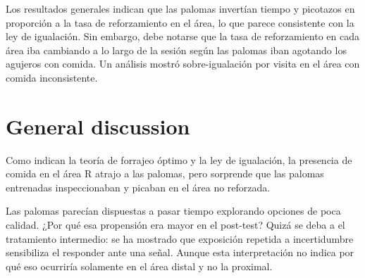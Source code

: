 \documentclass[a4paper,12pt]{article}
\begin{document}
Los resultados generales indican que las palomas invertían tiempo y picotazos en proporción a la tasa de reforzamiento en el área, lo que parece consistente con la ley de igualación. Sin embargo, debe notarse que la tasa de reforzamiento en cada área iba cambiando a lo largo de la sesión según las palomas iban agotando los agujeros con comida. Un análisis mostró sobre-igualación por visita en el área con comida inconsistente.

\section{General discussion}

Como indican la teoría de forrajeo óptimo y la ley de igualación, la presencia de comida en el área R atrajo a las palomas, pero sorprende que las palomas entrenadas inspeccionaban y picaban en el área no reforzada.

Las palomas parecían dispuestas a pasar tiempo explorando opciones de poca calidad. ¿Por qué esa propensión era mayor en el post-test? Quizá se deba a el tratamiento intermedio: se ha mostrado que exposición repetida a incertidumbre sensibiliza el responder ante una señal. Aunque esta interpretación no indica por qué eso ocurriría solamente en el área distal y no la proximal.
\end{document}

